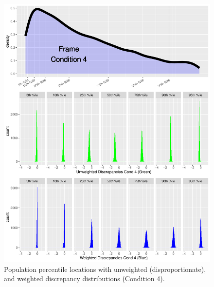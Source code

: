 \documentclass[
  ,man]{apa6}
\begin{document}
\begin{figure}
\centering
\includegraphics{NormsBuilding_files/figure-latex/Figure6-1.pdf}
\caption{\label{fig:Figure6}Population percentile locations with unweighted (disproportionate), and weighted discrepancy distributions (Condition 4).}
\end{figure}
\end{document}

